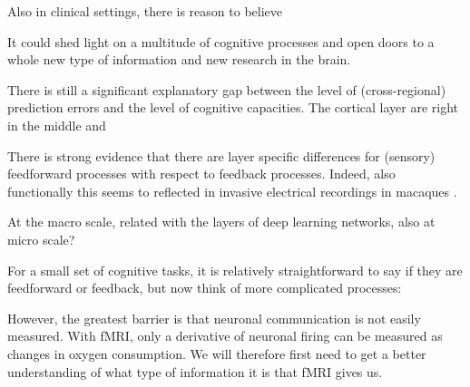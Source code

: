  
 
Also in clinical settings, there is reason to believe 


It could shed light on a multitude of cognitive processes and open doors to a whole new type of information and new research in the brain.






There is still a significant explanatory gap between the level of (cross-regional) prediction errors and the level of cognitive capacities. The cortical layer are right in the middle and 

There is strong evidence that there are layer specific differences for (sensory) feedforward processes with respect to feedback processes. Indeed, also functionally this seems to reflected in invasive electrical recordings in macaques \cite{Buffalo2011,Maier2010,Maier2011,VanKerkoerle2017}. 
 

At the macro scale, related with the layers of deep learning networks, also at micro scale?\cite{Guclu}
 

For a small set of cognitive tasks, it is relatively straightforward to say if they are feedforward or feedback, but now think of more complicated processes: 

 

However, the greatest barrier is that neuronal communication is not easily measured. With fMRI, only a derivative of neuronal firing can be measured as changes in oxygen consumption. We will therefore first need to get a better understanding of what type of information it is that fMRI gives us.



